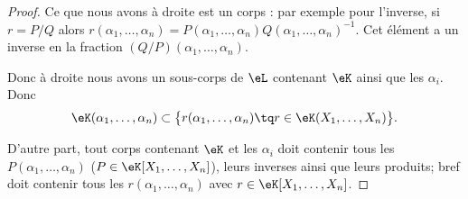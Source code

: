 \begin{proof}
	Ce que nous avons à droite est un corps : par exemple pour l'inverse, si \( r=P/Q\) alors \( r(\alpha_1,\ldots,\alpha_n)=P(\alpha_1,\ldots, \alpha_n)Q(\alpha_1,\ldots, \alpha_n)^{-1}\). Cet élément a un inverse en la fraction \( (Q/P)(\alpha_1,\ldots, \alpha_n)\).

	Donc à droite nous avons un sous-corps de \( \eL\) contenant \( \eK\) ainsi que les \( \alpha_i\). Donc
	\begin{equation}
		\eK(\alpha_1,\ldots, \alpha_n)\subset \big\{ r(\alpha_1,\ldots, \alpha_n)\tq r\in \eK(X_1,\ldots, X_n) \big\}.
	\end{equation}

	D'autre part, tout corps contenant \( \eK\) et les \( \alpha_i\) doit contenir tous les \( P(\alpha_1,\ldots, \alpha_n)\) (\( P\in \eK[X_1,\ldots, X_n]\)), leurs inverses ainsi que leurs produits; bref doit contenir tous les \( r(\alpha_1,\ldots, \alpha_n)\) avec \( r\in\eK[X_1,\ldots, X_n]\).
\end{proof}
